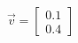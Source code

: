 \documentclass[preview]{standalone}
\begin{document}
\begin{align*}
\vec{v}=\begin{bmatrix}0.1\\0.4\end{bmatrix}
\end{align*}
\end{document}
